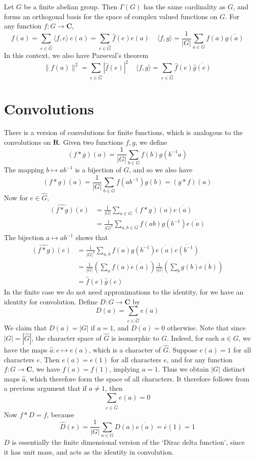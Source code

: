 \begin{theorem}
    Let $G$ be a finite abelian group. Then $\Gamma(G)$ has the same cardinality as $G$, and forms an orthogonal basis for the space of complex valued functions on $G$. For any function $f: G \to \mathbf{C}$,
    \[ f(a) = \sum_{e \in \hat{G}} \langle f, e \rangle\ e(a) = \sum_{e \in \hat{G}} \hat{f}(e) e(a)\ \ \ \ \ \langle f, g \rangle = \frac{1}{|G|} \sum_{a \in G} f(a) \overline{g(a)} \]
    In this context, we also have Parseval's theorem
    \[ \| f(a) \|^2 = \sum_{e \in \hat{G}} |\hat{f}(e)|^2\ \ \ \ \ \langle f, g \rangle = \sum_{e \in \hat{G}} \hat{f}(e) \overline{\hat{g}(e)} \]
\end{theorem}

\section{Convolutions}

There is a version of convolutions for finite functions, which is analogous to the convolutions on $\mathbf{R}$. Given two functions $f,g$, we define
%
\[ (f * g)(a) = \frac{1}{|G|} \sum_{b \in G} f(b) g(b^{-1} a) \]
%
The mapping $b \mapsto ab^{-1}$ is a bijection of $G$, and so we also have
%
\[ (f * g)(a) = \frac{1}{|G|} \sum_{b \in G} f(ab^{-1}) g(b) = (g * f)(a) \]
%
Now for $e \in \hat{G}$,
%
\begin{align*}
    \widehat{(f * g)}(e) &= \frac{1}{|G|} \sum_{a \in G} (f*g)(a) \overline{e(a)}\\
    &= \frac{1}{|G|^2} \sum_{a,b \in G} f(ab) g(b^{-1}) \overline{e(a)}
\end{align*}
%
The bijection $a \mapsto ab^{-1}$ shows that
%
\begin{align*}
    \widehat{(f*g)}(e) &= \frac{1}{|G|^2} \sum_{a,b} f(a) g(b^{-1}) \overline{e(a)} \overline{e(b^{-1})}\\
    &= \frac{1}{|G|} \left( \sum_a f(a) \overline{e(a)} \right) \frac{1}{|G|} \left( \sum_b g(b) \overline{e(b)} \right)\\
    &= \hat{f}(e) \hat{g}(e)
\end{align*}
%
In the finite case we do not need approximations to the identity, for we have an identity for convolution. Define $D: G \to \mathbf{C}$ by
%
\[ D(a) = \sum_{e \in \hat{G}} e(a) \]
%
We claim that $D(a) = |G|$ if $a = 1$, and $D(a) = 0$ otherwise. Note that since $|G| = |\hat{G}|$, the character space of $\hat{G}$ is isomorphic to $G$. Indeed, for each $a \in G$, we have the maps $\hat{a}: e \mapsto e(a)$, which is a character of $\hat{G}$. Suppose $e(a) = 1$ for all characters $e$. Then $e(a) = e(1)$ for all characters $e$, and for any function $f: G \to \mathbf{C}$, we have $f(a) = f(1)$, implying $a = 1$. Thus we obtain $|G|$ distinct maps $\hat{a}$, which therefore form the space of all characters. It therefore follows from a previous argument that if $a \neq 1$, then
%
\[ \sum_{e \in \hat{G}} e(a) = 0 \]
%
Now $f * D = f$, because
%
\[ \widehat{D}(e) = \frac{1}{|G|} \sum_{a \in G} D(a) \overline{e(a)} = \overline{e}(1) = 1 \]
%
$D$ is essentially the finite dimensional version of the `Dirac delta function', since it has unit mass, and acts as the identity in convolution.

